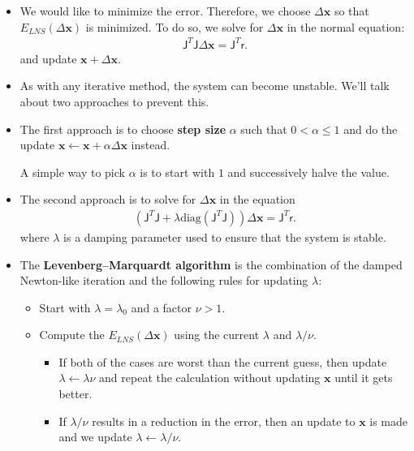 \documentclass[10pt]{article}
\newcommand{\ve}[1]{\mathbf{#1}}
\newcommand{\msf}[1]{\mathsf{#1}}
\begin{document}
\begin{itemize}
    \item We would like to minimize the error. Therefore, we choose
      $\Delta \ve{x}$ so that $E_{LNS}(\Delta \ve{x})$ is minimized.
      To do so, we solve for $\Delta \ve{x}$ in the normal equation:
      \begin{align*}
        \msf{J}^T \msf{J} \Delta \ve{x} = \msf{J}^T \msf{r}.
      \end{align*}      
      and update $\ve{x} + \Delta \ve{x}$.        
      
    \item As with any iterative method, the system can become unstable.
      We'll talk about two approaches to prevent this.
      
    \item The first approach is to choose {\bf step size} $\alpha$
      such that $0 < \alpha \leq 1$ and do the update 
      $\ve{x} \gets \ve{x} + \alpha \Delta \ve{x}$
      instead.
      
      A simple way to pick $\alpha$ is to start with $1$
      and successively halve the value. 
      
    \item The second approach is to solve for $\Delta \ve{x}$ in
      the equation
      \begin{align*}
        (\msf{J}^T \msf{J} + \lambda \mathrm{diag}(\msf{J}^T \msf{J})) 
          \Delta \ve{x} = \msf{J}^T \msf{r}.
      \end{align*}      
      where $\lambda$ is a damping parameter used to ensure that 
      the system is stable.
      
    \item The {\bf Levenberg--Marquardt algorithm} is the combination
      of the damped Newton-like iteration and the following rules
      for updating $\lambda$:
      \begin{itemize}
        \item Start with $\lambda = \lambda_0$ and a factor $\nu > 1$.
        \item Compute the $E_{LNS}(\Delta \ve{x})$ using
          the current $\lambda$ and $\lambda / \nu$.
          \begin{itemize}
            \item If both of the cases are worst than the current
              guess, then update $\lambda \gets \lambda \nu$
              and repeat the calculation without updating
              $\ve{x}$ until it gets better.
              
            \item If $\lambda / \nu$ results in a reduction in
              the error, then an update to $\ve{x}$ is made
              and we update $\lambda \gets \lambda / \nu$.
              

\end{itemize}
\end{itemize}
\end{itemize}
\end{document}
